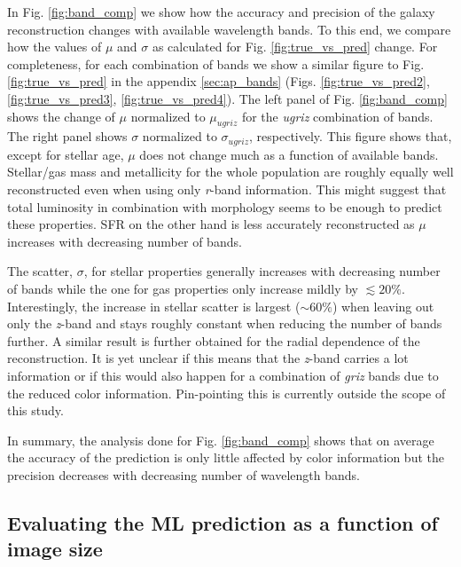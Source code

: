 \documentclass[conference]{IEEEtran}
\begin{document}
In Fig. \ref{fig:band_comp} we show how the accuracy and precision of the galaxy reconstruction changes with available wavelength bands. To this end, we compare how the values of $\mu$ and $\sigma$ as calculated for Fig. \ref{fig:true_vs_pred} change. For completeness, for each combination of bands we show a similar figure to Fig. \ref{fig:true_vs_pred} in the appendix \ref{sec:ap_bands} (Figs. \ref{fig:true_vs_pred2}, \ref{fig:true_vs_pred3}, \ref{fig:true_vs_pred4}). The left panel of Fig. \ref{fig:band_comp} shows the change of $\mu$ normalized to $\mu_{ ugriz}$ for the \emph{ugriz} combination of bands. The right panel shows $\sigma$ normalized to $\sigma_{ ugriz}$, respectively.
This figure shows that, except for stellar age, $\mu$ does not change much as a function of available bands. Stellar/gas mass and metallicity for the whole population are roughly equally well reconstructed even when using only \emph{r}-band information. This might suggest that total luminosity in combination with morphology seems to be enough to predict these properties. SFR on the other hand is less accurately reconstructed as $\mu$ increases with decreasing number of bands.  

The scatter, $\sigma$, for stellar properties generally increases with decreasing number of bands while the one for gas properties only increase mildly by $\lesssim20\%$. Interestingly, the increase in stellar scatter is largest ($\sim60\%$) when leaving out only the \emph{z}-band and stays roughly constant when reducing the number of bands further. A similar result is further obtained for the radial dependence of the reconstruction. 
It is yet unclear if this means that the \emph{z}-band carries a lot information or if this would also happen for a combination of \emph{griz} bands due to the reduced color information. Pin-pointing this is currently outside the scope of this study. 

In summary, the analysis done for Fig. \ref{fig:band_comp} shows that on average the accuracy of the prediction is only little affected by color information but the precision decreases with decreasing number of wavelength bands. 

\subsection{Evaluating the ML prediction as a function of image size}
\label{sec:resolution}
\end{document}
